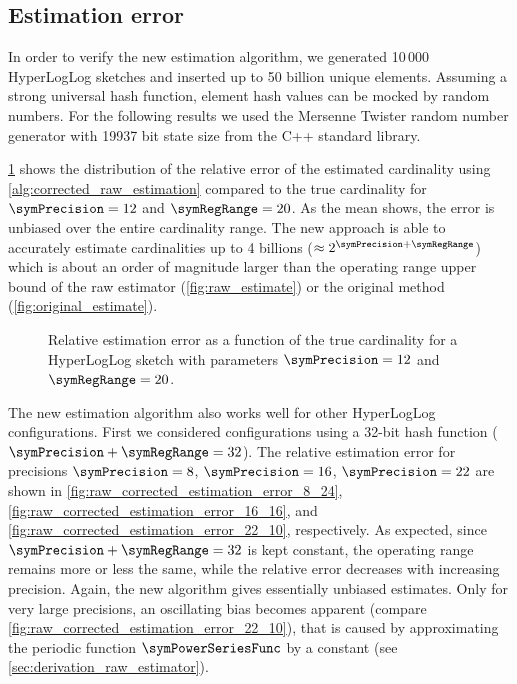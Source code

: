 \documentclass[a4paper]{scrartcl}
\begin{document}
\subsection{Estimation error}
\label{sec:corrected_raw_estimation_error}
In order to verify the new estimation algorithm, we generated 10\,000 HyperLogLog sketches and inserted up to 50 billion unique elements. Assuming a strong universal hash function, element hash values can be mocked by random numbers. For the following results we used the Mersenne Twister random number generator with 19937 bit state size from the C++ standard library.

\cref{fig:raw_corrected_estimation_error_12_20} shows the distribution of the relative error of the estimated cardinality using \cref{alg:corrected_raw_estimation} compared to the true cardinality for $\symPrecision=12$ and $\symRegRange=20$. As the mean shows, the error is unbiased over the entire cardinality range. The new approach is able to accurately estimate cardinalities up to 4 billions ($\approx 2^{\symPrecision+\symRegRange}$) which is about an order of magnitude larger than the operating range upper bound of the raw estimator (\cref{fig:raw_estimate}) or the original method (\cref{fig:original_estimate}).

\begin{figure}
\centering

\caption{Relative estimation error as a function of the true cardinality for a HyperLogLog sketch with parameters $\symPrecision = 12$ and $\symRegRange=20$.}
\label{fig:raw_corrected_estimation_error_12_20}
\end{figure}

The new estimation algorithm also works well for other HyperLogLog configurations. First we considered configurations using a 32-bit hash function ($\symPrecision + \symRegRange = 32$). The relative estimation error for precisions $\symPrecision=8$, $\symPrecision=16$, $\symPrecision=22$ are shown in \cref{fig:raw_corrected_estimation_error_8_24}, \cref{fig:raw_corrected_estimation_error_16_16}, and \cref{fig:raw_corrected_estimation_error_22_10}, respectively. As expected, since  $\symPrecision + \symRegRange = 32$ is kept constant, the operating range remains more or less the same, while the relative error decreases with increasing precision. Again, the new algorithm gives essentially unbiased estimates. Only for very large precisions, an oscillating bias becomes apparent (compare \cref{fig:raw_corrected_estimation_error_22_10}), that is caused by approximating the periodic function $\symPowerSeriesFunc$ by a constant (see \cref{sec:derivation_raw_estimator}).
\end{document}
